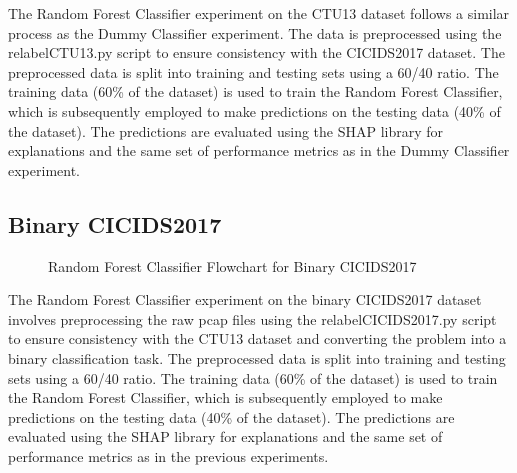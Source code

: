 The Random Forest Classifier experiment on the CTU13 dataset follows a similar process as the Dummy Classifier experiment. The data is preprocessed using the relabelCTU13.py script to ensure consistency with the CICIDS2017 dataset. The preprocessed data is split into training and testing sets using a 60/40 ratio. The training data (60\% of the dataset) is used to train the Random Forest Classifier, which is subsequently employed to make predictions on the testing data (40\% of the dataset). The predictions are evaluated using the SHAP library for explanations and the same set of performance metrics as in the Dummy Classifier experiment.

\subsection{Binary CICIDS2017}
\begin{figure}[H]
\centering
{}
\caption{Random Forest Classifier Flowchart for Binary CICIDS2017}\label{fig:RandomForestFlowBinaryCICIDS2017}
\end{figure}

The Random Forest Classifier experiment on the binary CICIDS2017 dataset involves preprocessing the raw pcap files using the relabelCICIDS2017.py script to ensure consistency with the CTU13 dataset and converting the problem into a binary classification task. The preprocessed data is split into training and testing sets using a 60/40 ratio. The training data (60\% of the dataset) is used to train the Random Forest Classifier, which is subsequently employed to make predictions on the testing data (40\% of the dataset). The predictions are evaluated using the SHAP library for explanations and the same set of performance metrics as in the previous experiments.

